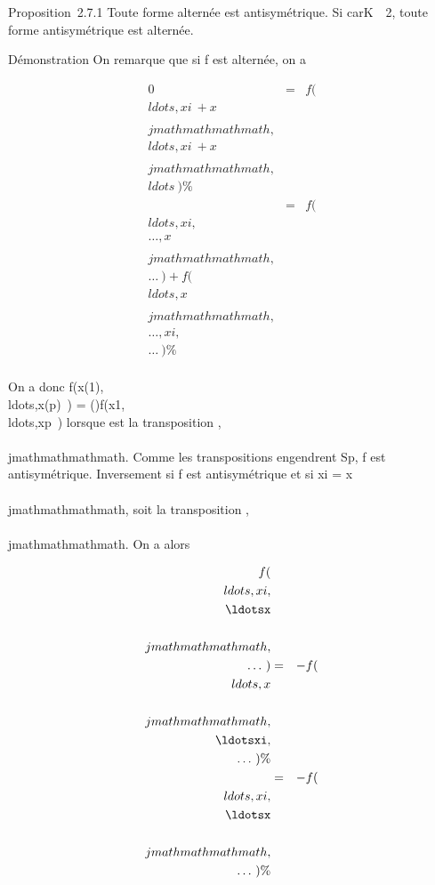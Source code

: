 Proposition~2.7.1 Toute forme alternée est antisymétrique. Si
carK\mathrel\neq~~2, toute forme
antisymétrique est alternée.

Démonstration On remarque que si f est alternée, on a

\begin{align*} 0& =&
f(\\ldots,xi~
+
x\\\\jmathmathmathmath,\\ldots,xi~
+
x\\\\jmathmathmathmath,\\ldots~)
\%& \\ & =&
f(\\ldots,xi,\\\ldots,x\\\\jmathmathmathmath,\\\ldots~)
+
f(\\ldots,x\\\\jmathmathmathmath,\\\ldots,xi,\\\ldots~)\%&
\\ \end{align*}

On a donc
f(x\sigma(1),\\ldots,x\sigma(p)~)
=
\epsilon(\sigma)f(x1,\\ldots,xp~)
lorsque \sigma est la transposition \taui,\\\\jmathmathmathmath. Comme les transpositions
engendrent Sp, f est antisymétrique. Inversement si f est
antisymétrique et si xi = x\\\\jmathmathmathmath, soit \sigma la
transposition \taui,\\\\jmathmathmathmath. On a alors

\begin{align*}
f(\\ldots,xi,\\\ldotsx\\\\jmathmathmathmath,\\\ldots~)&
=&
-f(\\ldots,x\\\\jmathmathmathmath,\\\ldotsxi,\\\ldots~)\%&
\\ & =&
-f(\\ldots,xi,\\\ldotsx\\\\jmathmathmathmath,\\\ldots~)\%&
\\ \end{align*}

